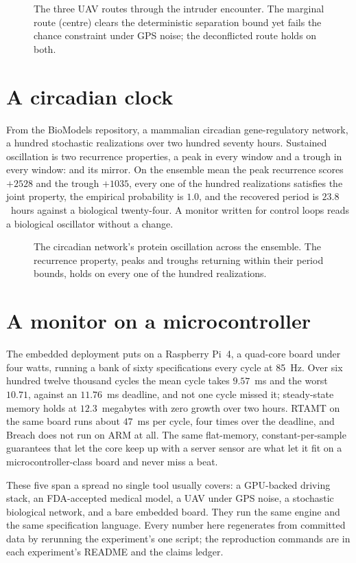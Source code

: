 \begin{figure}[h]
\centering
{}
\caption{The three UAV routes through the intruder encounter. The marginal route (centre) clears the deterministic separation bound yet fails the chance constraint under GPS noise; the deconflicted route holds on both.}
\label{fig:uav}
\end{figure}

\section{A circadian clock}

From the BioModels repository, a mammalian circadian gene-regulatory network, a hundred stochastic realizations over two hundred seventy hours. Sustained oscillation is two recurrence properties, a peak in every window and a trough in every window:  and its mirror. On the ensemble mean the peak recurrence scores $+2528$ and the trough $+1035$, every one of the hundred realizations satisfies the joint property, the empirical probability is $1.0$, and the recovered period is $23.8$~hours against a biological twenty-four. A monitor written for control loops reads a biological oscillator without a change.

\begin{figure}[h]
\centering
{}
\caption{The circadian network's protein oscillation across the ensemble. The recurrence property, peaks and troughs returning within their period bounds, holds on every one of the hundred realizations.}
\label{fig:circadian}
\end{figure}

\section{A monitor on a microcontroller}

The embedded deployment puts \sentil{} on a Raspberry Pi~4, a quad-core board under four watts, running a bank of sixty specifications every cycle at 85~Hz. Over six hundred twelve thousand cycles the mean cycle takes $9.57$~ms and the worst $10.71$, against an $11.76$~ms deadline, and not one cycle missed it; steady-state memory holds at $12.3$~megabytes with zero growth over two hours. RTAMT on the same board runs about $47$~ms per cycle, four times over the deadline, and Breach does not run on ARM at all. The same flat-memory, constant-per-sample guarantees that let the core keep up with a server sensor are what let it fit on a microcontroller-class board and never miss a beat.

\begin{notebox}
These five span a spread no single tool usually covers: a GPU-backed driving stack, an FDA-accepted medical model, a UAV under GPS noise, a stochastic biological network, and a bare embedded board. They run the same engine and the same specification language. Every number here regenerates from committed data by rerunning the experiment's one script; the reproduction commands are in each experiment's README and the claims ledger.
\end{notebox}